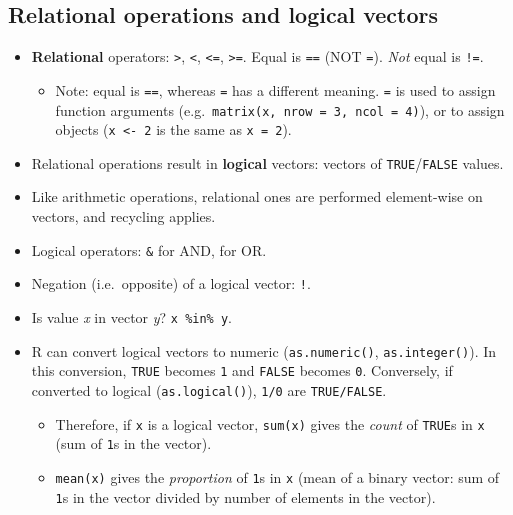 \documentclass[
]{book}
\providecommand{\tightlist}{%
  \setlength{\itemsep}{0pt}\setlength{\parskip}{0pt}}
\begin{document}
\hypertarget{relational-operations-and-logical-vectors}{%
\subsection{Relational operations and logical vectors}\label{relational-operations-and-logical-vectors}}

\begin{itemize}
\tightlist
\item
  \textbf{Relational} operators: \texttt{\textgreater{}}, \texttt{\textless{}}, \texttt{\textless{}=}, \texttt{\textgreater{}=}. Equal is \texttt{==} (NOT \texttt{=}). \emph{Not} equal is \texttt{!=}.

  \begin{itemize}
  \tightlist
  \item
    Note: equal is \texttt{==}, whereas \texttt{=} has a different meaning. \texttt{=} is used to assign function arguments (e.g.~\texttt{matrix(x,\ nrow\ =\ 3,\ ncol\ =\ 4)}), or to assign objects (\texttt{x\ \textless{}-\ 2} is the same as \texttt{x\ =\ 2}).
  \end{itemize}
\item
  Relational operations result in \textbf{logical} vectors: vectors of \texttt{TRUE}/\texttt{FALSE} values.
\item
  Like arithmetic operations, relational ones are performed element-wise on vectors, and recycling applies.
\item
  Logical operators: \texttt{\&} for AND, \texttt{\textbar{}} for OR.
\item
  Negation (i.e.~opposite) of a logical vector: \texttt{!}.
\item
  Is value \emph{x} in vector \emph{y}? \texttt{x\ \%in\%\ y}.
\item
  R can convert logical vectors to numeric (\texttt{as.numeric()}, \texttt{as.integer()}). In this conversion, \texttt{TRUE} becomes \texttt{1} and \texttt{FALSE} becomes \texttt{0}. Conversely, if converted to logical (\texttt{as.logical()}), \texttt{1/0} are \texttt{TRUE/FALSE}.

  \begin{itemize}
  \tightlist
  \item
    Therefore, if \texttt{x} is a logical vector, \texttt{sum(x)} gives the \emph{count} of \texttt{TRUE}s in \texttt{x} (sum of \texttt{1}s in the vector).
  \item
    \texttt{mean(x)} gives the \emph{proportion} of \texttt{1}s in \texttt{x} (mean of a binary vector: sum of \texttt{1}s in the vector divided by number of elements in the vector).
  \end{itemize}
\end{itemize}
\end{document}
